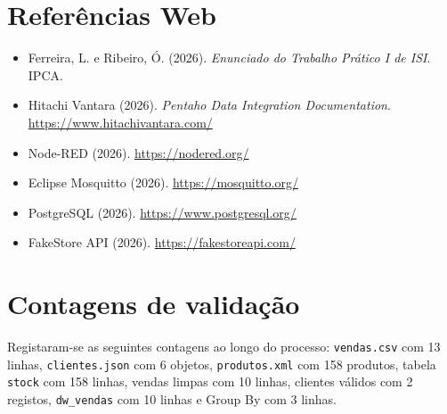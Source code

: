 \documentclass[11pt,a4paper]{article}
\begin{document}
\section{Referências Web}
\begin{itemize}
\item Ferreira, L. e Ribeiro, Ó. (2026). \textit{Enunciado do Trabalho Prático I de ISI}. IPCA.
\item Hitachi Vantara (2026). \textit{Pentaho Data Integration Documentation}. \url{https://www.hitachivantara.com/}
\item Node-RED (2026). \url{https://nodered.org/}
\item Eclipse Mosquitto (2026). \url{https://mosquitto.org/}
\item PostgreSQL (2026). \url{https://www.postgresql.org/}
\item FakeStore API (2026). \url{https://fakestoreapi.com/}
\end{itemize}

\appendix
\section{Contagens de validação}
Registaram-se as seguintes contagens ao longo do processo: \texttt{vendas.csv} com 13 linhas, \texttt{clientes.json} com 6 objetos, \texttt{produtos.xml} com 158 produtos, tabela \texttt{stock} com 158 linhas, vendas limpas com 10 linhas, clientes válidos com 2 registos, \texttt{dw\_vendas} com 10 linhas e Group By com 3 linhas.
\end{document}
